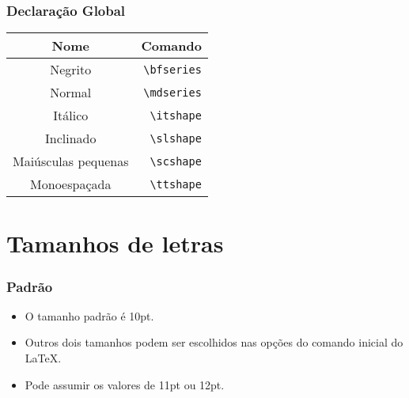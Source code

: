 \documentclass[brazilian]{beamer}
\begin{document}
\begin{frame}[fragile]
    \frametitle{Declaração Global}

    \begin{table}[h]
        \begin{tabular}{c|r}
            Nome                & Comando                 \\ \hline
            Negrito             & \lstinline[style=myStyleLatex]!\bfseries! \\ \hline
            Normal              & \lstinline[style=myStyleLatex]!\mdseries! \\ \hline
            Itálico             & \lstinline[style=myStyleLatex]!\itshape! \\ \hline
            Inclinado           & \lstinline[style=myStyleLatex]!\slshape! \\ \hline
            Maiúsculas pequenas & \lstinline[style=myStyleLatex]!\scshape! \\ \hline
            Monoespaçada        & \lstinline[style=myStyleLatex]!\ttshape! \\ \hline
        \end{tabular}
    \end{table}

\end{frame}

\section{Tamanhos de letras}

\begin{frame}[fragile]
    \frametitle{Padrão}

    \begin{itemize}
        \item O tamanho padrão é 10pt.
        \item Outros dois tamanhos podem ser escolhidos nas opções do comando inicial do \LaTeX.
        \item Pode assumir os valores de 11pt ou 12pt.
    \end{itemize}

\end{frame}
\end{document}
